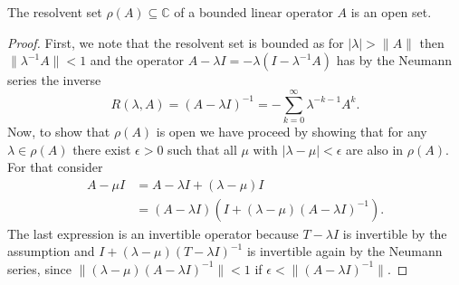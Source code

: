 \begin{theorem}
	The resolvent set $\rho(A) \subseteq \mathbb{C}$ of a bounded linear operator $A$ is an open set.
	
	\begin{proof}
		First, we note that the resolvent set is bounded as for $|\lambda| > \|A\|$ then $\| \lambda^{-1} A \| < 1$ and the operator $A - \lambda I = -\lambda (I - \lambda^{-1} A)$ has by the Neumann series the inverse
		$$ R(\lambda, A) = (A - \lambda I)^{-1} = - \sum_{k=0}^{\infty} \lambda^{-k-1} A^{k}. $$
		Now, to show that $\rho(A)$ is open we have proceed by showing that for any $\lambda \in \rho(A)$ there exist $\epsilon > 0$ such that all $\mu$ with $|\lambda- \mu| < \epsilon$ are also in $\rho(A)$. For that consider
		\begin{align*}
			A - \mu I & = A - \lambda I + (\lambda - \mu) I \\
					  & = (A - \lambda I)\left(I + (\lambda - \mu) (A - \lambda I)^{-1} \right).
		\end{align*}
		The last expression is an invertible operator because $T - \lambda I$ is invertible by the assumption and $I + (\lambda - \mu)(T - \lambda I)^{-1}$ is invertible again by the Neumann series, since $\|(\lambda - \mu)(A - \lambda I)^{-1}\| < 1$ if $\epsilon < \|(A - \lambda I)^{-1}\|$.
	\end{proof}
\end{theorem}